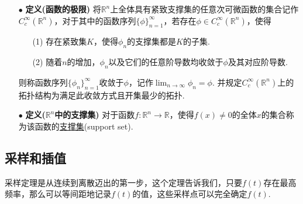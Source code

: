 \documentclass[main.tex]{subfiles}
\begin{document}
\begin{itemize}
    \item [\(\bullet\)] \textbf{定义(函数的极限)}
    \newline
    将\(\mathbb{R}^n\)上全体具有紧致支撑集的任意次可微函数的集合记作\(C_c^{\infty}\left(\mathbb{R}^n\right)\)，对于其中的函数序列\(\{\phi\}_{n=1}^{\infty}\)，若存在\(\phi \in C_c^{\infty}\left(\mathbb{R}^n\right)\)，使得
    \begin{itemize}
        \item [(1)] 存在紧致集\(K\)，使得\(\phi_n\)的支撑集都是\(K\)的子集.
        \item [(2)] 随着\(n\)的增加，\(\phi_n\)以及它们的任意阶导数均收敛于\(\phi\)及其对应阶导数.
    \end{itemize}
    则称函数序列\(\{\phi_n\}_{n=1}^{\infty}\)收敛于\(\phi\)，记作\(\displaystyle{\lim_{n \to \infty}\phi_n=\phi}\). 并规定\(C_c^{\infty}\left(\mathbb{R}^n\right)\)上的拓扑结构为满足此收敛方式且开集最少的拓扑.
\end{itemize}

\begin{itemize}
    \item [\(\bullet\)] \textbf{定义(\(\mathbb{R}^n\)中的支撑集)}
    \newline
    对于函数\(f:\mathbb{R}^n \to \mathbb{R}\)，使得\(f(x) \neq 0\)的全体\(x\)的集合称为该函数的\uline{支撑集}(support set).
\end{itemize}

\subsection{采样和插值}

采样定理是从连续到离散迈出的第一步，这个定理告诉我们，只要\(f(t)\)存在最高频率，那么可以等间距地记录\(f(t)\)的值，这些采样点可以完全确定\(f(t)\).
\end{document}
